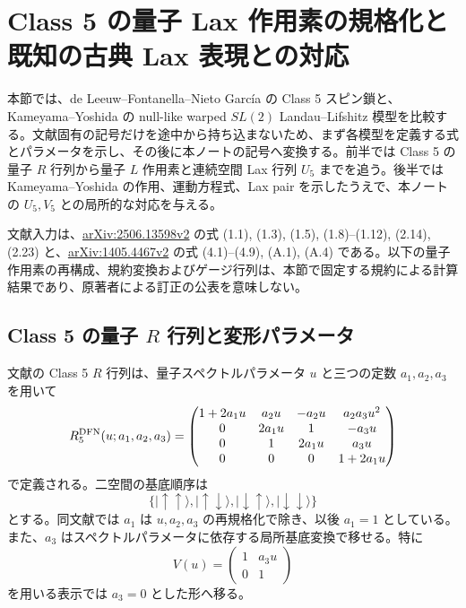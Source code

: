 \section{Class 5 の量子 Lax 作用素の規格化と既知の古典 Lax 表現との対応}
\label{sec:class5-lax-correspondence}

本節では、de Leeuw--Fontanella--Nieto Garc\'ia の Class 5 スピン鎖\cite{DFN2026}と、Kameyama--Yoshida の null-like warped $SL(2)$ Landau--Lifshitz 模型\cite{KY2014}を比較する。文献固有の記号だけを途中から持ち込まないため、まず各模型を定義する式とパラメータを示し、その後に本ノートの記号へ変換する。前半では Class 5 の量子 $R$ 行列から量子 $L$ 作用素と連続空間 Lax 行列 $U_5$ までを追う。後半では Kameyama--Yoshida の作用、運動方程式、Lax pair を示したうえで、本ノートの $U_5,V_5$ との局所的な対応を与える。

文献入力は、\href{https://arxiv.org/abs/2506.13598v2}{arXiv:2506.13598v2} の式 (1.1), (1.3), (1.5), (1.8)--(1.12), (2.14), (2.23) と、\href{https://arxiv.org/abs/1405.4467v2}{arXiv:1405.4467v2} の式 (4.1)--(4.9), (A.1), (A.4) である。以下の量子作用素の再構成、規約変換およびゲージ行列は、本節で固定する規約による計算結果であり、原著者による訂正の公表を意味しない。

\subsection{Class 5 の量子 $R$ 行列と変形パラメータ}

文献\cite{DFN2026}の Class 5 $R$ 行列は、量子スペクトルパラメータ $u$ と三つの定数 $a_1,a_2,a_3$ を用いて
\begin{equation}
R^{\rm DFN}_5(u;a_1,a_2,a_3)=
\begin{pmatrix}
1+2a_1u&a_2u&-a_2u&a_2a_3u^2\\
0&2a_1u&1&-a_3u\\
0&1&2a_1u&a_3u\\
0&0&0&1+2a_1u
\end{pmatrix}
\label{eq:c5corr-DFN-R-general}
\end{equation}
で定義される。二空間の基底順序は
\begin{equation}
\{|\!\uparrow\uparrow\rangle,|\!\uparrow\downarrow\rangle,
|\!\downarrow\uparrow\rangle,|\!\downarrow\downarrow\rangle\}
\end{equation}
とする。同文献では $a_1$ は $u,a_2,a_3$ の再規格化で除き、以後 $a_1=1$ としている。また、$a_3$ はスペクトルパラメータに依存する局所基底変換で移せる。特に
\begin{equation}
V(u)=\begin{pmatrix}1&a_3u\\0&1\end{pmatrix}
\label{eq:c5corr-DFN-basis-change}
\end{equation}
を用いる表示では $a_3=0$ とした形へ移る。

